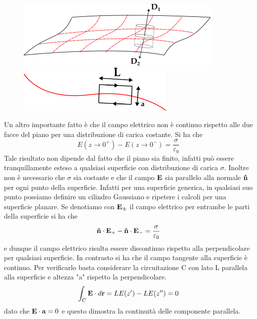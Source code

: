 \begin{figure}[!ht]
\centering
\begin{minipage}{0.5\textwidth}
  \centering
  \includegraphics[width= 0.9\linewidth]{images/surface}
\end{minipage}%
\hspace{0.8cm}
\begin{minipage}{0.4\textwidth}
  \centering
  \includegraphics[width=0.8\linewidth]{images/path}
\end{minipage}
\end{figure}

Un altro importante fatto \`e che il campo elettrico non \`e continuo rispetto alle due facce del piano per una distribuzione di carica costante. Si ha che 
\begin{equation*}
	E(z \to 0^+) - E(z \to 0^-) = \frac{\sigma }{\varepsilon_0}
\end{equation*}
Tale risultato non dipende dal fatto che il piano sia finito, infatti pu\`o essere tranquillamente esteso a qualsiasi superficie con distribuzione di carica $\sigma$. Inoltre non \`e necessario che $\sigma $ sia costante  e che il campo $\bold{E}$ sia parallelo alla normale $\bold{\hat{n}}$ per ogni punto della superficie. Infatti per una superficie generica, in qualsiasi suo punto possiamo definire un cilindro Gaussiano e ripetere i calcoli per una superficie planare. Se denotiamo con $\bold{E}_{\pm}$ il campo elettrico per entrambe le parti della superficie si ha che 
\begin{equation}
	\bold{\hat{n}} \cdot \bold{E}_{+} - \bold{\hat{n}} \cdot \bold{E}_{-} = \frac{\sigma}{\varepsilon_0}
\end{equation}
e dunque il campo elettrico risulta essere discontinuo rispetto alla perpendicolare per qualsiasi superficie. In contrasto si ha che il campo tangente alla superficie \`e continuo. Per verificarlo basta considerare la circuitazione C con lato L parallela alla superficie e altezza "a" rispetto la perpendicolare.
\begin{equation*}
	\int_{C} \bold{E} \cdot d \bold{r} = LE(z')-LE(z'') = 0 
\end{equation*}
dato che $\bold{E} \cdot \bold{a} = 0$ e questo dimostra la continuit\`a delle componente parallela.

